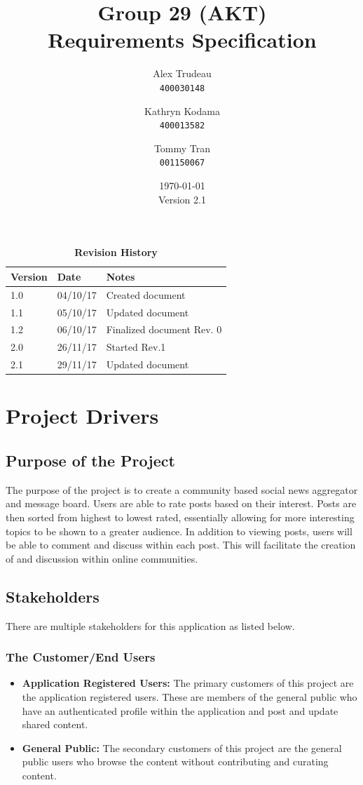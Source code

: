 \documentclass[12pt,fleqn]{article}
\title{Group 29 (AKT)\\ Requirements Specification}
\author{
Alex Trudeau\\
	\texttt{400030148}
\and
Kathryn Kodama\\
  	\texttt{400013582}
\and
Tommy Tran\\
	\texttt{001150067}
}
\date{\today\\Version 2.1}
\begin{document}
\maketitle

\pagebreak
\tableofcontents
\listoftables
\listoffigures

\begin{table}[ht]
\caption{\bf Revision History}
\begin{tabularx}{\textwidth}{p{3cm}p{2cm}X}
\toprule {\bf Version} & {\bf Date} & {\bf Notes}\\
\midrule
1.0 & 04/10/17 & Created document \\
1.1 & 05/10/17 & Updated document \\
1.2 & 06/10/17 & Finalized document Rev. 0 \\
2.0 & 26/11/17 & Started Rev.1 \\
2.1 & 29/11/17 & Updated document \\
\bottomrule
\end{tabularx}
\end{table}

\clearpage
 


\section {Project Drivers}

\subsection {Purpose of the Project}
The purpose of the project is to create a community based social news aggregator and message board. Users are able to rate posts based on their interest. Posts are then sorted from highest to lowest rated, essentially allowing for more interesting topics to be shown to a greater audience. In addition to viewing posts, users will be able to comment and discuss within each post.  This will facilitate the creation of and discussion within online communities.

\subsection {Stakeholders}

There are multiple stakeholders for this application as listed below.

\subsubsection* {The Customer/End Users}
\begin{itemize} 
\item \textbf{Application Registered Users: }The primary customers of this project are the application registered users. These are members of the general public who have an authenticated profile within the application and post and update shared content.
\item \textbf{General Public: }The secondary customers of this project are the general public users who browse the content without contributing and curating content.
\end{itemize}
\end{document}
